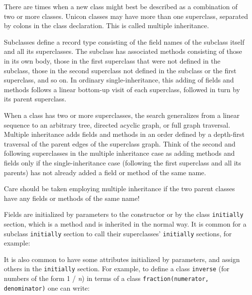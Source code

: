 There are times when a new class might best
be described as a combination of two or more classes. Unicon classes
may have more than one superclass, separated by colons in the class
declaration. This is called multiple inheritance.

Subclasses define a record type consisting of the field names of the
subclass itself and all its superclasses. The subclass has associated
methods consisting of those in its own body, those in the first
superclass that were not defined in the subclass, those in the second
superclass not defined in the subclass or the first superclass, and so
on. In ordinary single-inheritance, this adding of fields and methods
follows a linear bottom-up visit of each superclass,
followed in turn by its parent superclass.

When a class has two or more superclasses, the search generalizes from a
linear sequence to an arbitrary tree, directed acyclic
graph, or full graph traversal.
Multiple inheritance adds fields and
methods in an order defined by a depth-first traversal of the parent
edges of the superclass graph. Think of the second and following
superclasses in the
multiple inheritance case as adding methods and fields only if the
single-inheritance case (following the first superclass and all its
parents) has not already added a field or method of the same name.

\medskip{}
{\sffamily
Care should be taken employing multiple inheritance if the two parent
classes have any fields or methods of the same name! }\medskip

Fields are initialized by parameters to the constructor or by the
class \texttt{initially} section, which is a method and is
inherited in the normal way. It is common for a subclass \texttt{initially}
section to call their superclasses'
\texttt{initially} sections, for example:


\noindent
It is also common to have some attributes initialized by parameters, and
assign others in the \texttt{initially} section. For example, to define a
class \texttt{inverse} (for numbers of the form 1 / \textit{n}) in terms
of a class \texttt{fraction(numerator, denominator)} one can write:

